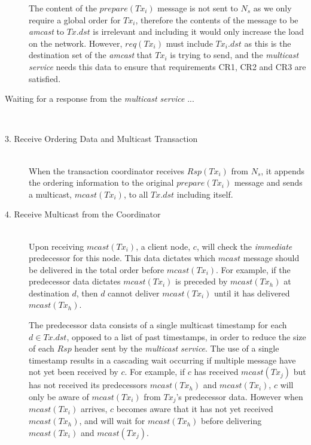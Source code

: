 \begin{description}
        The content of the $prepare(Tx_i)$ message is not sent to $N_s$ as we only require a global order for $Tx_i$, therefore the contents of the message to be \emph{amcast} to $Tx.dst$ is irrelevant and including it would only increase the load on the network.  However, $req(Tx_i)$ must include $Tx_i.dst$ as this is the destination set of the \emph{amcast} that $Tx_i$ is trying to send, and the \emph{multicast service} needs this data to ensure that requirements CR1, CR2 and CR3 are satisfied.  
        
        \item[Waiting for a response from the \emph{multicast service} ...] \hfill \\
        
        \item[3. Receive Ordering Data and Multicast Transaction] \hfill \\
        When the transaction coordinator receives $Rsp(Tx_i)$ from $N_s$, it appends the ordering information to the original $prepare(Tx_i)$ message and sends a multicast, $mcast(Tx_i)$, to all $Tx.dst$ including itself. 
        
        \item[4. Receive Multicast from the Coordinator] \hfill \\
        Upon receiving $mcast(Tx_i)$, a client node, $c$, will check the \emph{immediate} predecessor for this node.  This data dictates which $mcast$ message should be delivered in the total order before $mcast(Tx_i)$.  For example, if the predecessor data dictates $mcast(Tx_i)$ is preceded by $mcast(Tx_h)$ at destination $d$, then $d$ cannot deliver $mcast(Tx_i)$ until it has delivered $mcast(Tx_h)$.  
        
        The predecessor data consists of a single multicast timestamp for each $d \in Tx.dst$, opposed to a list of past timestamps, in order to reduce the size of each $Rsp$ header sent by the \emph{multicast service}.  The use of a single timestamp results in a cascading wait occurring if multiple message have not yet been received by $c$.  For example, if $c$ has received $mcast(Tx_j)$ but has not received its predecessors $mcast(Tx_h)$ and $mcast(Tx_i)$, $c$ will only be aware of $mcast(Tx_i)$ from $Tx_j$'s predecessor data.  However when $mcast(Tx_i)$ arrives, $c$ becomes aware that it has not yet received $mcast(Tx_h)$,  and will wait for $mcast(Tx_h)$ before delivering $mcast(Tx_i)$ and $mcast(Tx_j)$.          
    \end{description}


